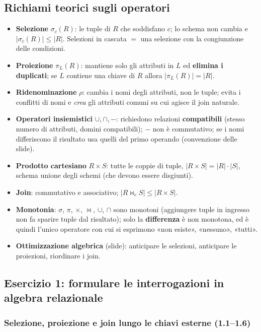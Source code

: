 \documentclass[12pt, a4paper]{article}
\begin{document}
\subsection{Richiami teorici sugli operatori}
\begin{itemize}
\item \textbf{Selezione} $\sigma_c(R)$: le tuple di $R$ che soddisfano $c$; lo schema non cambia e $|\sigma_c(R)|\le|R|$. Selezioni in cascata $=$ una selezione con la congiunzione delle condizioni.
\item \textbf{Proiezione} $\pi_L(R)$: mantiene solo gli attributi in $L$ ed \textbf{elimina i duplicati}; se $L$ contiene una chiave di $R$ allora $|\pi_L(R)|=|R|$.
\item \textbf{Ridenominazione} $\rho$: cambia i nomi degli attributi, non le tuple; evita i conflitti di nomi e \emph{crea} gli attributi comuni su cui agisce il join naturale.
\item \textbf{Operatori insiemistici} $\cup,\cap,-$: richiedono relazioni \textbf{compatibili} (stesso numero di attributi, domini compatibili); $-$ non è commutativo; se i nomi differiscono il risultato usa quelli del primo operando (convenzione delle slide).
\item \textbf{Prodotto cartesiano} $R\times S$: tutte le coppie di tuple, $|R\times S|=|R|\cdot|S|$, schema unione degli schemi (che devono essere disgiunti).
\item \textbf{Join}: commutativo e associativo; $|R\bowtie_c S|\le|R\times S|$.
\item \textbf{Monotonia}: $\sigma$, $\pi$, $\times$, $\bowtie$, $\cup$, $\cap$ sono monotoni (aggiungere tuple in ingresso non fa sparire tuple dal risultato); solo la \textbf{differenza} è non monotona, ed è quindi l'unico operatore con cui si esprimono «non esiste», «nessuno», «tutti».
\item \textbf{Ottimizzazione algebrica} (slide): anticipare le selezioni, anticipare le proiezioni, riordinare i join.
\end{itemize}

\subsection{Esercizio 1: formulare le interrogazioni in algebra relazionale}

\subsubsection{Selezione, proiezione e join lungo le chiavi esterne (1.1--1.6)}
\end{document}
